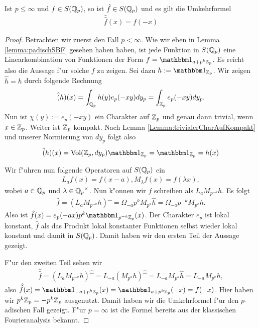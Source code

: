 		\begin{satz}\label{Satz:fourierumkehrformel}
			Ist $p\leq\infty$ und $f\in S({\mathbb{Q}_p})$, so ist $\hat{f} \in S({\mathbb{Q}_p})$ und es gilt die Umkehrformel
			\begin{align*}
				\hat{\hat{f}}(x) = f(-x)
			\end{align*}
		\end{satz}
		\begin{proof}
			Betrachten wir zuerst den Fall $p<\infty$. Wie wir eben in Lemma \ref{lemma:padischSBF} gesehen haben haben, ist jede Funktion in $S({\mathbb{Q}_p})$ eine Linearkombination von Funktionen der Form $f = \ind_{a+p^k\Zp}$. Es reicht also die Aussage f"ur solche $f$ zu zeigen.
			Sei dazu $h:= \ind_{\Zp}$. Wir zeigen $\hat{h} = h$ durch folgende Rechnung
			\begin{align*}
				\hat(h)(x) = \int_{\mathbb{Q}_p} h(y) e_p (-xy) dy_p = \int_{\mathbb{Z}_p} e_p(-xy) dy_p.
			\end{align*}
			Nun ist $\chi(y):=e_p(-xy)$ ein Charakter auf ${\mathbb{Z}_p}$ und genau dann trivial, wenn $x\in{\mathbb{Z}_p}$. 
			Weiter ist ${\mathbb{Z}_p}$ kompakt. 
			Nach Lemma \ref{Lemma:trivialerCharAufKompakt} und unserer Normierung von $dy_p$ folgt also
			\begin{align*}
				\hat(h)(x) = \text{Vol}(\Zp, dy_p) \ind_\Zp = \ind_\Zp = h(x)
			\end{align*}
			
			Wir f"uhren nun folgende Operatoren auf $S({\mathbb{Q}_p})$ ein
			\begin{align*}
				L_a f(x) = f(x-a), M_\lambda f(x) = f(\lambda x),
			\end{align*}
			wobei $a \in {\mathbb{Q}_p}$ und $\lambda \in {\mathbb{Q}_p}^\times$. 
			Nun k"onnen wir $f$ schreiben als $L_a M_{p^{-k}}h$. 
			Es folgt
			\begin{align*}
				\hat{f} = (L_a M_{p^{-k}}h)\widehat{\phantom{x}} = \Omega_{-a}p^{k}M_{p^k}\hat{h}=\Omega_{-a}p^{-k}M_{p^k}h.
			\end{align*}
			Also ist $\hat{f} (x) = e_p(-ax)p^k\ind_{p^{-k}\Zp}(x)$. 
			Der Charakter $e_p$ ist lokal konstant, $\hat{f}$ als das Produkt lokal konstanter Funktionen selbst wieder lokal konstant und damit in $S({\mathbb{Q}_p})$. 
			Damit haben wir den ersten Teil der Aussage gezeigt.
			
			F"ur den zweiten Teil sehen wir
			\begin{align*}
				\hat{\hat{f}} = (L_a M_{p^{-k}}h)\widehat{\widehat{\phantom{x}}} = L_{-a} (M_{p^k}h)\widehat{\widehat{\phantom{x}}}=L_{-a}M_{p^k}\hat{h} =L_{-a}M_{p^k}h,
			\end{align*}
			also $\hat{\hat{f}} (x) = \ind_{-a+p^k\Zp} (x) = \ind_{a+p^k\Zp} (-x) = f(-x)$. 
			Hier haben wir $p^k{\mathbb{Z}_p} = - p^k{\mathbb{Z}_p}$ ausgenutzt. 
			Damit haben wir die Umkehrformel f"ur den $p$-adischen Fall gezeigt. 
			F"ur $p=\infty$ ist die Formel bereits aus der klassischen Fourieranalysis bekannt.
		\end{proof}
	
